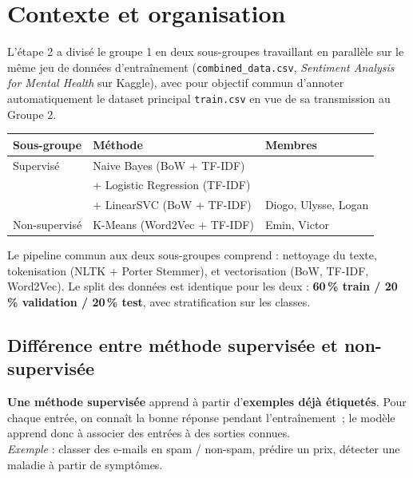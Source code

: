 \documentclass[12pt,a4paper]{article}
\begin{document}
\tableofcontents
\newpage

\section{Contexte et organisation}

L'étape 2 a divisé le groupe 1 en deux sous-groupes travaillant en parallèle sur le même jeu de données d'entraînement (\texttt{combined\_data.csv}, \textit{Sentiment Analysis for Mental Health} sur Kaggle), avec pour objectif commun d'annoter automatiquement le dataset principal \texttt{train.csv} en vue de sa transmission au Groupe 2.

\begin{center}
\begin{tabular}{lll}
\toprule
\textbf{Sous-groupe} & \textbf{Méthode} & \textbf{Membres} \\
\midrule
Supervisé    & Naive Bayes (BoW + TF-IDF) & \\
             & + Logistic Regression (TF-IDF) &  \\
             & + LinearSVC (BoW + TF-IDF) & Diogo, Ulysse, Logan \\
\midrule
Non-supervisé & K-Means (Word2Vec + TF-IDF)                               & Emin, Victor \\
\bottomrule
\end{tabular}
\end{center}

Le pipeline commun aux deux sous-groupes comprend : nettoyage du texte, tokenisation (NLTK + Porter Stemmer), et vectorisation (BoW, TF-IDF, Word2Vec). Le split des données est identique pour les deux : \textbf{60\,\% train / 20\,\% validation / 20\,\% test}, avec stratification sur les classes.

\subsection{Différence entre méthode supervisée et non-supervisée}

\textbf{Une méthode supervisée} apprend à partir d'\textbf{exemples déjà étiquetés}. Pour chaque entrée, on connaît la bonne réponse pendant l'entraînement~; le modèle apprend donc à associer des entrées à des sorties connues.\\
\textit{Exemple} : classer des e-mails en spam / non-spam, prédire un prix, détecter une maladie à partir de symptômes.
\end{document}
